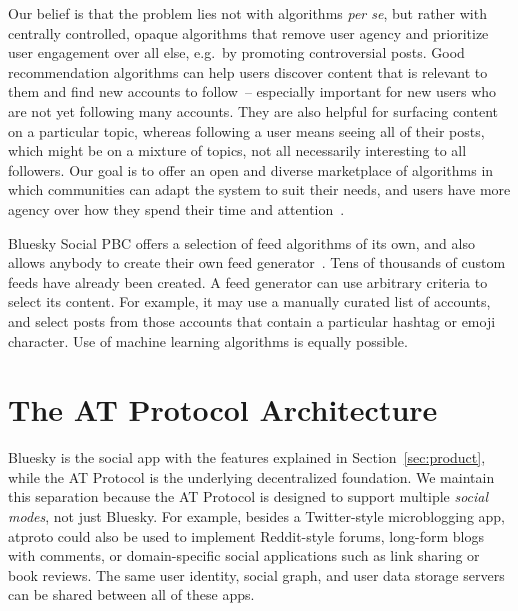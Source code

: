\documentclass[sigconf]{acmart}
\begin{document}
Our belief is that the problem lies not with algorithms \emph{per se}, but rather with centrally controlled, opaque algorithms that remove user agency and prioritize user engagement over all else, e.g.\ by promoting controversial posts.
Good recommendation algorithms can help users discover content that is relevant to them and find new accounts to follow~-- especially important for new users who are not yet following many accounts.
They are also helpful for surfacing content on a particular topic, whereas following a user means seeing all of their posts, which might be on a mixture of topics, not all necessarily interesting to all followers.
Our goal is to offer an open and diverse marketplace of algorithms in which communities can adapt the system to suit their needs, and users have more agency over how they spend their time and attention~\cite{AlgorithmicChoice}.

Bluesky Social PBC offers a selection of feed algorithms of its own, and also allows anybody to create their own feed generator~\cite{CustomFeeds}.
Tens of thousands of custom feeds have already been created.
A feed generator can use arbitrary criteria to select its content.
For example, it may use a manually curated list of accounts, and select posts from those accounts that contain a particular hashtag or emoji character.
Use of machine learning algorithms is equally possible.

\section{The AT Protocol Architecture}\label{sec:architecture}

Bluesky is the social app with the features explained in Section~\ref{sec:product}, while the AT Protocol is the underlying decentralized foundation.
We maintain this separation because the AT Protocol is designed to support multiple \emph{social modes}, not just Bluesky.
For example, besides a Twitter-style microblogging app, atproto could also be used to implement Reddit-style forums, long-form blogs with comments, or domain-specific social applications such as link sharing or book reviews.
The same user identity, social graph, and user data storage servers can be shared between all of these apps.
\end{document}
